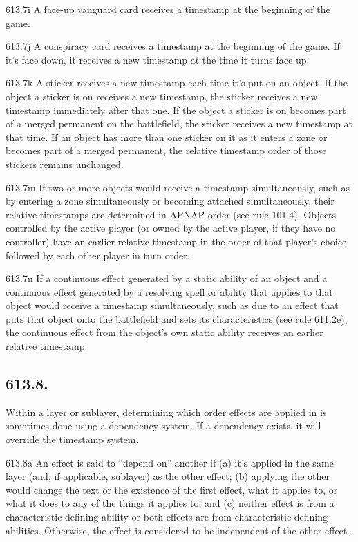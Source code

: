 613.7i A face-up vanguard card receives a timestamp at the beginning of the game.

613.7j A conspiracy card receives a timestamp at the beginning of the game. If it’s face down, it receives a new timestamp at the time it turns face up.

613.7k A sticker receives a new timestamp each time it’s put on an object. If the object a sticker is on receives a new timestamp, the sticker receives a new timestamp immediately after that one. If the object a sticker is on becomes part of a merged permanent on the battlefield, the sticker receives a new timestamp at that time. If an object has more than one sticker on it as it enters a zone or becomes part of a merged permanent, the relative timestamp order of those stickers remains unchanged.

613.7m If two or more objects would receive a timestamp simultaneously, such as by entering a zone simultaneously or becoming attached simultaneously, their relative timestamps are determined in APNAP order (see rule 101.4). Objects controlled by the active player (or owned by the active player, if they have no controller) have an earlier relative timestamp in the order of that player’s choice, followed by each other player in turn order.

613.7n If a continuous effect generated by a static ability of an object and a continuous effect generated by a resolving spell or ability that applies to that object would receive a timestamp simultaneously, such as due to an effect that puts that object onto the battlefield and sets its characteristics (see rule 611.2e), the continuous effect from the object’s own static ability receives an earlier relative timestamp.

\subsection*{613.8.}
Within a layer or sublayer, determining which order effects are applied in is sometimes done using a dependency system. If a dependency exists, it will override the timestamp system.

613.8a An effect is said to “depend on” another if (a) it’s applied in the same layer (and, if applicable, sublayer) as the other effect; (b) applying the other would change the text or the existence of the first effect, what it applies to, or what it does to any of the things it applies to; and (c) neither effect is from a characteristic-defining ability or both effects are from characteristic-defining abilities. Otherwise, the effect is considered to be independent of the other effect.


